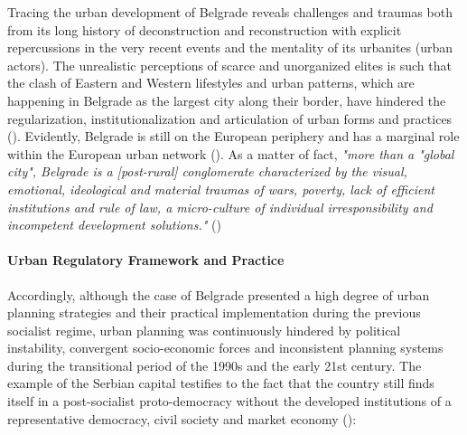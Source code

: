 \documentclass[11pt]{report}
\begin{document}
Tracing the urban development of Belgrade reveals challenges and traumas both from its long history of deconstruction and reconstruction with explicit repercussions in the very recent events and the mentality of its urbanites (urban actors). The unrealistic perceptions of scarce and unorganized elites is such that the clash of Eastern and Western lifestyles and urban patterns, which are happening in Belgrade as the largest city along their border, have hindered the regularization, institutionalization and articulation of urban forms and practices (\href{Samardzic}{\citealt{doytchinov_belgrade_2015}}).
Evidently, Belgrade is still on the European periphery and has a marginal role within the European urban network (\href{Vujovic}{\citealt{vujovic_belgrades_2007}}). 
As a matter of fact, \textit{"more  than  a  "global  city",  Belgrade  is  a  [post-rural]  conglomerate characterized by the visual, emotional, ideological and material traumas of wars, poverty, lack of efficient institutions and rule of law, a micro-culture of  individual  irresponsibility  and  incompetent  development  solutions."} (\href{Doytchinov}{\citealt{doytchinov_belgrade_2015}}) 
\\

\paragraph{Urban Regulatory Framework and Practice}

Accordingly, although the case of Belgrade presented a high degree of urban planning strategies and their practical implementation during the previous socialist regime, urban planning was continuously hindered by political instability, convergent socio-economic forces and inconsistent planning systems during the transitional period of the 1990s and the early 21st century. The example of the Serbian capital testifies to the fact that the country still finds itself in a post-socialist proto-democracy without the developed institutions of a representative democracy, civil society and market economy (\href{Vujosevic}{\citealt{vujosevic_collapse_2010}}):
 
\end{document}
